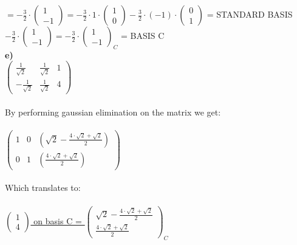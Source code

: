 \documentclass[11pt]{amsart}
\begin{document}
$ = -\frac{3}{2} \cdot \begin{pmatrix} 1 \\ -1 \end{pmatrix} = - \frac{3}{2} \cdot 1 \cdot 
	\begin{pmatrix} 1 \\ 0 \end{pmatrix} - \frac{3}{2} \cdot (-1) \cdot 
	\begin{pmatrix} 0 \\ 1 \end{pmatrix} $  = STANDARD BASIS \\
	
$ -\frac{3}{2} \cdot \begin{pmatrix} 1 \\ -1 \end{pmatrix} = -\frac{3}{2} \cdot \begin{pmatrix} 1 \\ -1 \end{pmatrix}_C$ = BASIS C \\
 
 \textbf{e)}\\
 
$ \begin{pmatrix} \frac{1}{\sqrt{2}}&\frac{1}{\sqrt{2}}&1 \\ -\frac{1}{\sqrt{2}}&\frac{1}{\sqrt{2}}&4 \end{pmatrix} $ \\\\

By performing gaussian elimination on the matrix we get: \\\\

$ \begin{pmatrix} 1&0&(\sqrt2 - \frac{4\cdot\sqrt{2}+\sqrt{2}}{2}) \\ 0&1&(\frac{4\cdot\sqrt{2}+\sqrt{2}}{2}) \end{pmatrix}$\\\\

Which translates to: \\\\

\underline{\underline{$ \begin{pmatrix} 1\\4 \end{pmatrix} $ on basis C = $\begin{pmatrix} 	 
\sqrt2 - \frac{4\cdot\sqrt{2}+\sqrt{2}}{2} \\ \frac{4\cdot\sqrt{2}+\sqrt{2}}{2} \end{pmatrix}_C $ }}\\
\end{document}
